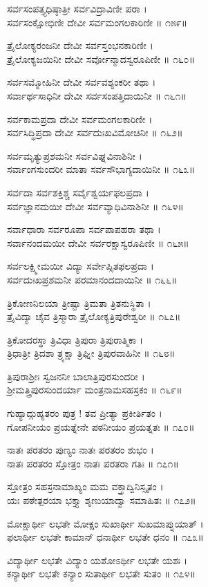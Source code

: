 ಸರ್ವಸಂಪತ್ತ್ಯಧಿಷ್ಠಾತ್ರೀ ಸರ್ವವಿದ್ರಾವಿಣೀ ಪರಾ ।\\
ಸರ್ವಸಂಕ್ಷೋಭಿಣೀ ದೇವೀ ಸರ್ವಮಂಗಲಕಾರಿಣೀ ॥ ೧೫೯॥

ತ್ರೈಲೋಕ್ಯರಂಜನೀ ದೇವೀ ಸರ್ವಸ್ತಂಭನಕಾರಿಣೀ ।\\
ತ್ರೈಲೋಕ್ಯಜಯಿನೀ ದೇವೀ ಸರ್ವೋನ್ಮಾದಸ್ವರೂಪಿಣೀ ॥ ೧೬೦॥

ಸರ್ವಸಮ್ಮೋಹಿನೀ ದೇವೀ ಸರ್ವವಶ್ಯಂಕರೀ ತಥಾ ।\\
ಸರ್ವಾರ್ಥಸಾಧಿನೀ ದೇವೀ ಸರ್ವಸಂಪತ್ತಿದಾಯಿನೀ ॥ ೧೬೧॥

ಸರ್ವಕಾಮಪ್ರದಾ ದೇವೀ ಸರ್ವಮಂಗಲಕಾರಿಣೀ ।\\
ಸರ್ವಸಿದ್ಧಿಪ್ರದಾ ದೇವೀ ಸರ್ವದುಃಖವಿಮೋಚಿನೀ ॥ ೧೬೨॥

ಸರ್ವಮೃತ್ಯುಪ್ರಶಮನೀ ಸರ್ವವಿಘ್ನವಿನಾಶಿನೀ ।\\
ಸರ್ವಾಂಗಸುಂದರೀ ಮಾತಾ ಸರ್ವಸೌಭಾಗ್ಯದಾಯಿನೀ ॥ ೧೬೩॥

ಸರ್ವದಾ ಸರ್ವಶಕ್ತಿಶ್ಚ ಸರ್ವೈಶ್ವರ್ಯಫಲಪ್ರದಾ ।\\
ಸರ್ವಜ್ಞಾನಮಯೀ ದೇವೀ ಸರ್ವವ್ಯಾಧಿವಿನಾಶಿನೀ ॥ ೧೬೪॥

ಸರ್ವಾಧಾರಾ ಸರ್ವರೂಪಾ ಸರ್ವಪಾಪಹರಾ ತಥಾ ।\\
ಸರ್ವಾನಂದಮಯೀ ದೇವೀ ಸರ್ವರಕ್ಷಾಸ್ವರೂಪಿಣೀ ॥ ೧೬೫॥

ಸರ್ವಲಕ್ಷ್ಮೀಮಯೀ ವಿದ್ಯಾ ಸರ್ವೇಪ್ಸಿತಫಲಪ್ರದಾ ।\\
ಸರ್ವದುಃಖಪ್ರಶಮನೀ ಪರಮಾನಂದದಾಯಿನೀ ॥ ೧೬೬॥

ತ್ರಿಕೋಣನಿಲಯಾ ತ್ರೀಷ್ಟಾ ತ್ರಿಮತಾ ತ್ರಿತನುಸ್ಥಿತಾ ।\\
ತ್ರೈವಿದ್ಯಾ ಚೈವ ತ್ರಿಸ್ಮಾರಾ ತ್ರೈಲೋಕ್ಯತ್ರಿಪುರೇಶ್ವರೀ ॥ ೧೬೭॥

ತ್ರಿಕೋದರಸ್ಥಾ ತ್ರಿವಿಧಾ ತ್ರಿಪುರಾ ತ್ರಿಪುರಾತ್ಮಿಕಾ ।\\
ತ್ರಿಧಾತ್ರೀ ತ್ರಿದಶಾ ತ್ರ್ಯಕ್ಷಾ ತ್ರಿಘ್ನೀ ತ್ರಿಪುರವಾಹಿನೀ ॥ ೧೬೮॥

ತ್ರಿಪುರಾಶ್ರೀಃ ಸ್ವಜನನೀ ಬಾಲಾತ್ರಿಪುರಸುಂದರೀ ।\\
ಶ್ರೀಮತ್ತ್ರಿಪುರಸುಂದರ್ಯಾ ಮಂತ್ರನಾಮಸಹಸ್ರಕಂ ॥ ೧೬೯॥

ಗುಹ್ಯಾದ್ಗುಹ್ಯತರಂ ಪುತ್ರ ! ತವ ಪ್ರೀತ್ಯಾ ಪ್ರಕೀರ್ತಿತಂ ।\\
ಗೋಪನೀಯಂ ಪ್ರಯತ್ನೇನೇ ಪಠನೀಯಂ ಪ್ರಯತ್ನತಃ ॥ ೧೭೦॥

ನಾತಃ ಪರತರಂ ಪುಣ್ಯಂ ನಾತಃ ಪರತರಂ ಶುಭಂ ।\\
ನಾತಃ ಪರತರಂ ಸ್ತೋತ್ರಂ ನಾತಃ ಪರತರಾ ಗತಿಃ ॥ ೧೭೧॥

ಸ್ತೋತ್ರಂ ಸಹಸ್ರನಾಮಾಖ್ಯಂ ಮಮ ವಕ್ತ್ರಾದ್ವಿನಿಸ್ಸೃತಂ ।\\
ಯಃ ಪಠೇತ್ಪರಯಾ ಭಕ್ತ್ಯಾ ಶೃಣುಯಾದ್ವಾ ಸಮಾಹಿತಃ ॥ ೧೭೨॥

ಮೋಕ್ಷಾರ್ಥೀ ಲಭತೇ ಮೋಕ್ಷಂ ಸುಖಾರ್ಥೀ ಸುಖಮಾಪ್ನುಯಾತ್ ।\\
ಫಲಾರ್ಥೀ ಲಭತೇ ಕಾಮಾನ್ ಧನಾರ್ಥೀ ಲಭತೇ ಧನಂ ॥ ೧೭೩॥

ವಿದ್ಯಾರ್ಥೀ ಲಭತೇ ವಿದ್ಯಾಂ ಯಶೋಽರ್ಥೀ ಲಭತೇ ಯಶಃ ।\\
ಕನ್ಯಾರ್ಥೀ ಲಭತೇ ಕನ್ಯಾಂ ಸುತಾರ್ಥೀ ಲಭತೇ ಸುತಂ ॥ ೧೭೪॥

